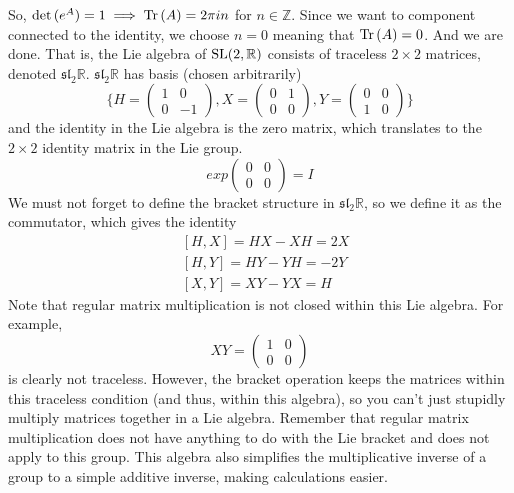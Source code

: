     So, $\det{(e^A)} = 1 \implies \operatorname{Tr}{(A)} = 2 \pi i n$ for $n \in \mathbb{Z}$. Since we want to component connected to the identity, we choose $n=0$ meaning that $\operatorname{Tr}{(A)} = 0$. And we are done. That is, the Lie algebra of $\operatorname{SL}(2, \mathbb{R})$ consists of traceless $2 \times 2$ matrices, denoted $\mathfrak{sl}_2 \mathbb{R}$. $\mathfrak{sl}_2 \mathbb{R}$ has basis (chosen arbitrarily) 
    \begin{equation}
      \bigg\{ H = \begin{pmatrix}
      1&0\\0&-1
      \end{pmatrix}, X = \begin{pmatrix}
      0&1\\0&0
      \end{pmatrix}, Y = \begin{pmatrix}
      0&0\\1&0
      \end{pmatrix}\bigg\}
    \end{equation}
    and the identity in the Lie algebra is the zero matrix, which translates to the $2 \times 2$ identity matrix in the Lie group. 
    \begin{equation}
      exp \begin{pmatrix}
      0&0\\0&0
      \end{pmatrix} = I
    \end{equation}
    We must not forget to define the bracket structure in $\mathfrak{sl}_2 \mathbb{R}$, so we define it as the commutator, which gives the identity
    \begin{align*}
      & [H,X] = HX - XH = 2X \\
      & [H,Y] = HY - YH = -2Y \\
      & [X,Y] = XY - YX = H
    \end{align*}
    Note that regular matrix multiplication is not closed within this Lie algebra. For example, 
    \begin{equation}
      X Y = \begin{pmatrix}
      1&0\\0&0
      \end{pmatrix}
    \end{equation}
    is clearly not traceless. However, the bracket operation keeps the matrices within this traceless condition (and thus, within this algebra), so you can't just stupidly multiply matrices together in a Lie algebra. Remember that regular matrix multiplication does not have anything to do with the Lie bracket and does not apply to this group. This algebra also simplifies the multiplicative inverse of a group to a simple additive inverse, making calculations easier. 

